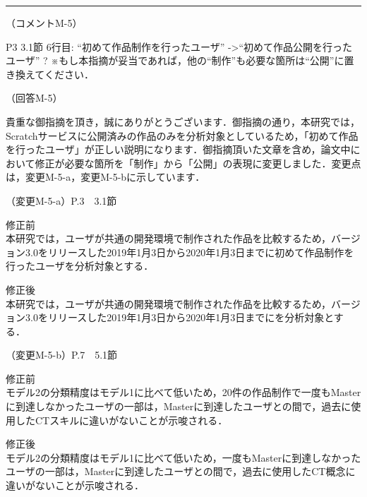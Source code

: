 \documentclass{jarticle} %
\def\subsection#1{ \vspace{1pc} {\gt #1} }
\def\nextans{ \vspace{2pc} \hrule }
\begin{document}
\newpage
\nextans
\subsection{（コメントM-5）}

P3 3.1節 6行目: ``初めて作品制作を行ったユーザ'' -\textgreater  ``初めて作品公開を行ったユーザ'' ? ※もし本指摘が妥当であれば，他の``制作''も必要な箇所は``公開''に置き換えてください．

\subsection{（回答M-5）}

貴重な御指摘を頂き，誠にありがとうございます．御指摘の通り，本研究では，Scratchサービスに公開済みの作品のみを分析対象としているため，「初めて作品を行ったユーザ」が正しい説明になります．御指摘頂いた文章を含め，論文中において修正が必要な箇所を「制作」から「公開」の表現に変更しました．変更点は，変更M-5-a，変更M-5-bに示しています．

\subsection{（変更M-5-a）P.3　3.1節}
\vspace{-0.3cm}
\begin{description}
\item 修正前\\
\phantom{　}
本研究では，ユーザが共通の開発環境で制作された作品を比較するため，バージョン3.0をリリースした2019年1月3日から2020年1月3日までに初めて作品制作を行ったユーザを分析対象とする．
\vspace{-0.3cm}
\item 修正後\\
\phantom{　}
本研究では，ユーザが共通の開発環境で制作された作品を比較するため，バージョン3.0をリリースした2019年1月3日から2020年1月3日までに\textcolor{red}{}を分析対象とする．
\end{description}

\subsection{（変更M-5-b）P.7　5.1節}
\vspace{-0.3cm}
\begin{description}
\item 修正前\\
\phantom{　}
モデル2の分類精度はモデル1に比べて低いため，20件の作品制作で一度もMasterに到達しなかったユーザの一部は，Masterに到達したユーザとの間で，過去に使用したCTスキルに違いがないことが示唆される．
\vspace{-0.3cm}
\item 修正後\\
\phantom{　}
モデル2の分類精度はモデル1に比べて低いため，\textcolor{red}{}一度もMasterに到達しなかったユーザの一部は，Masterに到達したユーザとの間で，過去に使用したCT概念に違いがないことが示唆される．
\end{description}
\end{document}

